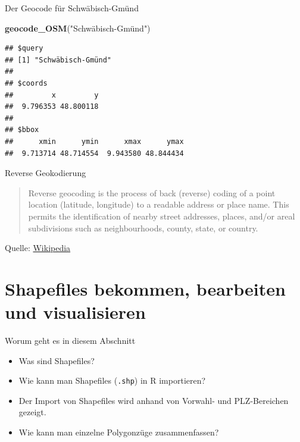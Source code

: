 \documentclass[ignorenonframetext,]{beamer}
\newenvironment{Shaded}{\begin{snugshade}}{\end{snugshade}}
\newcommand{\KeywordTok}[1]{\textcolor[rgb]{0.26,0.66,0.93}{\textbf{#1}}}
\newcommand{\StringTok}[1]{\textcolor[rgb]{0.02,0.61,0.04}{#1}}
\newcommand{\NormalTok}[1]{\textcolor[rgb]{0.74,0.68,0.62}{#1}}
\providecommand{\tightlist}{%
  \setlength{\itemsep}{0pt}\setlength{\parskip}{0pt}}
\begin{document}
\begin{frame}[fragile]{Der Geocode für Schwäbisch-Gmünd}

\begin{Shaded}
\begin{Highlighting}[]
\KeywordTok{geocode_OSM}\NormalTok{(}\StringTok{"Schwäbisch-Gmünd")}
\end{Highlighting}
\end{Shaded}

\begin{verbatim}
## $query
## [1] "Schwäbisch-Gmünd"
## 
## $coords
##         x         y 
##  9.796353 48.800118 
## 
## $bbox
##      xmin      ymin      xmax      ymax 
##  9.713714 48.714554  9.943580 48.844434
\end{verbatim}

\end{frame}

\begin{frame}{Reverse Geokodierung}

\begin{quote}
Reverse geocoding is the process of back (reverse) coding of a point
location (latitude, longitude) to a readable address or place name. This
permits the identification of nearby street addresses, places, and/or
areal subdivisions such as neighbourhoods, county, state, or country.
\end{quote}

Quelle:
\href{https://en.wikipedia.org/wiki/Reverse_geocoding}{Wikipedia}

\end{frame}

\section{Shapefiles bekommen, bearbeiten und
visualisieren}\label{shapefiles-bekommen-bearbeiten-und-visualisieren}

\begin{frame}[fragile]{Worum geht es in diesem Abschnitt}

\begin{itemize}
\tightlist
\item
  Was sind Shapefiles?
\item
  Wie kann man Shapefiles (\texttt{.shp}) in R importieren?
\item
  Der Import von Shapefiles wird anhand von Vorwahl- und PLZ-Bereichen
  gezeigt.
\item
  Wie kann man einzelne Polygonzüge zusammenfassen?
\end{itemize}

\end{frame}
\end{document}

